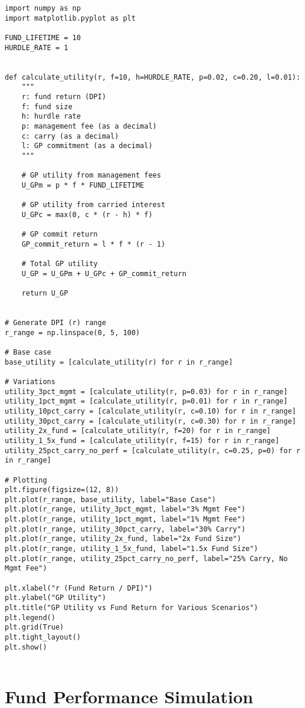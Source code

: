 \documentclass[a4paper, oneside]{discothesis}
\begin{document}
\begin{verbatim}
import numpy as np
import matplotlib.pyplot as plt

FUND_LIFETIME = 10
HURDLE_RATE = 1


def calculate_utility(r, f=10, h=HURDLE_RATE, p=0.02, c=0.20, l=0.01):
    """
    r: fund return (DPI)
    f: fund size
    h: hurdle rate
    p: management fee (as a decimal)
    c: carry (as a decimal)
    l: GP commitment (as a decimal)
    """

    # GP utility from management fees
    U_GPm = p * f * FUND_LIFETIME

    # GP utility from carried interest
    U_GPc = max(0, c * (r - h) * f)

    # GP commit return
    GP_commit_return = l * f * (r - 1)

    # Total GP utility
    U_GP = U_GPm + U_GPc + GP_commit_return

    return U_GP


# Generate DPI (r) range
r_range = np.linspace(0, 5, 100)

# Base case
base_utility = [calculate_utility(r) for r in r_range]

# Variations
utility_3pct_mgmt = [calculate_utility(r, p=0.03) for r in r_range]
utility_1pct_mgmt = [calculate_utility(r, p=0.01) for r in r_range]
utility_10pct_carry = [calculate_utility(r, c=0.10) for r in r_range]
utility_30pct_carry = [calculate_utility(r, c=0.30) for r in r_range]
utility_2x_fund = [calculate_utility(r, f=20) for r in r_range]
utility_1_5x_fund = [calculate_utility(r, f=15) for r in r_range]
utility_25pct_carry_no_perf = [calculate_utility(r, c=0.25, p=0) for r in r_range]

# Plotting
plt.figure(figsize=(12, 8))
plt.plot(r_range, base_utility, label="Base Case")
plt.plot(r_range, utility_3pct_mgmt, label="3% Mgmt Fee")
plt.plot(r_range, utility_1pct_mgmt, label="1% Mgmt Fee")
plt.plot(r_range, utility_30pct_carry, label="30% Carry")
plt.plot(r_range, utility_2x_fund, label="2x Fund Size")
plt.plot(r_range, utility_1_5x_fund, label="1.5x Fund Size")
plt.plot(r_range, utility_25pct_carry_no_perf, label="25% Carry, No Mgmt Fee")

plt.xlabel("r (Fund Return / DPI)")
plt.ylabel("GP Utility")
plt.title("GP Utility vs Fund Return for Various Scenarios")
plt.legend()
plt.grid(True)
plt.tight_layout()
plt.show()
    
\end{verbatim}

\chapter{Fund Performance Simulation}
\end{document}
